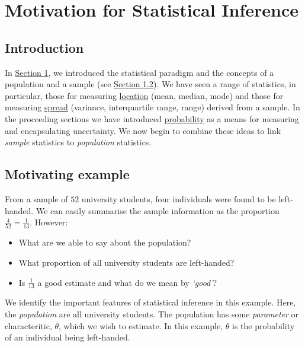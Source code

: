 \documentclass[
]{book}
\providecommand{\tightlist}{%
  \setlength{\itemsep}{0pt}\setlength{\parskip}{0pt}}
\begin{document}
\hfill\break

\hypertarget{motivate}{%
\chapter{Motivation for Statistical Inference}\label{motivate}}

\hypertarget{motivate:intro}{%
\section{Introduction}\label{motivate:intro}}

In \protect\hyperlink{intro}{Section 1}, we introduced the statistical paradigm and the concepts of a population and a sample (see \protect\hyperlink{intro_population}{Section 1.2}). We have seen a range of statistics, in particular, those for measuring \protect\hyperlink{summary_location}{location} (mean, median, mode) and those for measuring \protect\hyperlink{summary_spread}{spread} (variance, interquartile range, range) derived from a sample. In the proceeding sections we have introduced \protect\hyperlink{prob}{probability} as a means for measuring and encapsulating uncertainty. We now begin to combine these ideas to link \emph{sample} statistics to \emph{population} statistics.

\hypertarget{motivate:example}{%
\section{Motivating example}\label{motivate:example}}

From a sample of \(52\) university students, four individuals were found to be left-handed. We can easily summarise the sample information as the proportion \(\frac{4}{52} = \frac{1}{13}\). However:

\begin{itemize}
\tightlist
\item
  What are we able to say about the population?\\
\item
  What proportion of all university students are left-handed?\\
\item
  Is \(\frac{1}{13}\) a good estimate and what do we mean by \emph{`good'}?
\end{itemize}

We identify the important features of statistical inference in this example. Here, the \emph{population} are all university students. The population has some \emph{parameter} or characteritic, \(\theta\), which we wish to estimate. In this example, \(\theta\) is the probability of an individual being left-handed.
\end{document}

